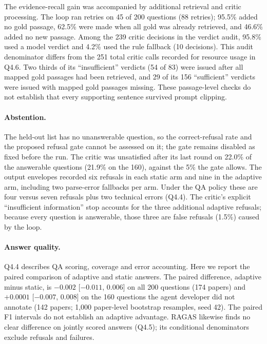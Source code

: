 The evidence-recall gain was accompanied by additional retrieval and critic processing. The loop ran retries on 45 of 200 questions (88 retries); 95.5\% added no gold passage, 62.5\% were made when all gold was already retrieved, and 46.6\% added no new passage. Among the 239 critic decisions in the verdict audit, 95.8\% used a model verdict and 4.2\% used the rule fallback (10 decisions). This audit denominator differs from the 251 total critic calls recorded for resource usage in Q4.6. Two thirds of its ``insufficient'' verdicts (54 of 83) were issued after all mapped gold passages had been retrieved, and 29 of its 156 ``sufficient'' verdicts were issued with mapped gold passages missing. These passage-level checks do not establish that every supporting sentence survived prompt clipping.

\paragraph{Abstention.}
The held-out list has no unanswerable question, so the correct-refusal rate and the proposed refusal gate cannot be assessed on it; the gate remains disabled as fixed before the run. The critic was unsatisfied after its last round on 22.0\% of the answerable questions (21.9\% on the 160), against the 5\% the gate allows. The output envelopes recorded six refusals in each static arm and nine in the adaptive arm, including two parse-error fallbacks per arm. Under the QA policy these are four versus seven refusals plus two technical errors (Q4.4). The critic's explicit ``insufficient information'' stop accounts for the three additional adaptive refusals; because every question is answerable, those three are false refusals (1.5\%) caused by the loop.

\paragraph{Answer quality.}
Q4.4 describes QA scoring, coverage and error accounting. Here we report the paired comparison of adaptive and static answers. The paired difference, adaptive minus static, is $-0.002$ [$-0.011$, 0.006] on all 200 questions (174 papers) and $+0.0001$ [$-0.007$, 0.008] on the 160 questions the agent developer did not annotate (142 papers; 1{,}000 paper-level bootstrap resamples, seed 42). The paired F1 intervals do not establish an adaptive advantage. RAGAS likewise finds no clear difference on jointly scored answers (Q4.5); its conditional denominators exclude refusals and failures.
